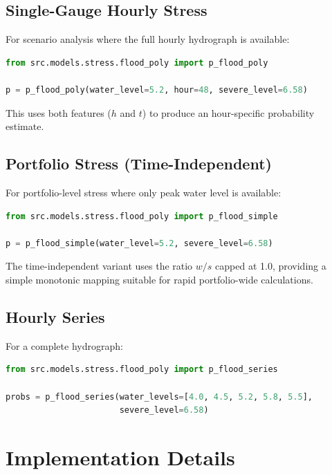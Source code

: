 \documentclass[11pt,a4paper]{article}
\begin{document}
\subsection{Single-Gauge Hourly Stress}
For scenario analysis where the full hourly hydrograph is available:

\begin{lstlisting}[language=Python]
from src.models.stress.flood_poly import p_flood_poly

p = p_flood_poly(water_level=5.2, hour=48, severe_level=6.58)
\end{lstlisting}

\noindent This uses both features ($h$ and $t$) to produce an hour-specific
probability estimate.

\subsection{Portfolio Stress (Time-Independent)}
For portfolio-level stress where only peak water level is available:

\begin{lstlisting}[language=Python]
from src.models.stress.flood_poly import p_flood_simple

p = p_flood_simple(water_level=5.2, severe_level=6.58)
\end{lstlisting}

\noindent The time-independent variant uses the ratio $w/s$ capped at 1.0,
providing a simple monotonic mapping suitable for rapid portfolio-wide
calculations.

\subsection{Hourly Series}
For a complete hydrograph:

\begin{lstlisting}[language=Python]
from src.models.stress.flood_poly import p_flood_series

probs = p_flood_series(water_levels=[4.0, 4.5, 5.2, 5.8, 5.5],
                       severe_level=6.58)
\end{lstlisting}

\section{Implementation Details}
\end{document}
